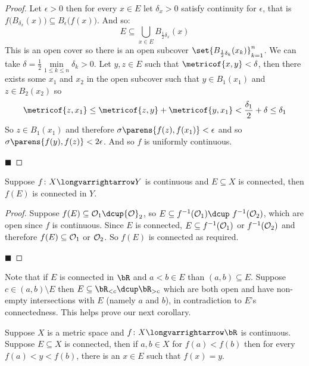 \documentclass[10pt]{article}
\def\openset{{\cal O}}
\begin{document}
\begin{proof}

    Let $\epsilon>0$ then for every $x\in E$ let $\delta_x>0$ satisfy continuity for $\epsilon$, that is $f\bigl(B_{\delta_x}(x)\bigr)\subseteq B_\epsilon\bigl(f(x)\bigr)$.
    And so:
    \[ E \subseteq \bigcup_{x\in E}B_{\frac12\delta_x}(x) \]
    This is an open cover so there is an open subcover $\set{B_{\frac12\delta_k}(x_k)}_{k=1}^n$.
    We can take $\delta=\frac12\min\limits_{1\leq k\leq n}\delta_k>0$.
    Let $y,z\in E$ such that $\metricof{x,y}<\delta$, then there exists some $x_1$ and $x_2$ in the open subcover such that $y\in B_1(x_1)$ and $z\in B_2(x_2)$ so
    \[ \metricof{z,x_1}\leq\metricof{z,y}+\metricof{y,x_1}<\frac{\delta_1}2+\delta\leq\delta_1 \]
    So $z\in B_1(x_1)$ and therefore $\sigma\parens{f(z),f(x_1)}<\epsilon$ and so $\sigma\parens{f(y),f(z)}<2\epsilon$.
    And so $f$ is uniformly continuous.

    \hfill$\blacksquare$

\end{proof}

\begin{prop*}

    Suppose $f\colon X\longvarrightarrow Y$ is continuous and $E\subseteq X$ is connected, then $f(E)$ is connected in $Y$.

\end{prop*}

\begin{proof}

    Suppose $f(E)\subseteq\openset_1\dcup\openset_2$, so $E\subseteq f^{-1}(\openset_1)\dcup\ f^{-1}(\openset_2)$, which are open since $f$ is continuous.
    Since $E$ is connected, $E\subseteq f^{-1}(\openset_1)$ or $f^{-1}(\openset_2)$ and therefore $f(E)\subseteq\openset_1$ or $\openset_2$.
    So $f(E)$ is connected as required.

    \hfill$\blacksquare$

\end{proof}

Note that if $E$ is connected in $\bR$ and $a<b\in E$ than $(a,b)\subseteq E$.
Suppose $c\in(a,b)\setminus E$ then $E\subseteq\bR_{<c}\dcup\bR_{>c}$ which are both open and have non-empty intersections with $E$ (namely $a$ and $b$), in contradiction to $E$'s connectedness.
This helps prove our next corollary.

\begin{coro*}

    Suppose $X$ is a metric space and $f\colon X\longvarrightarrow\bR$ is continuous.
    Suppose $E\subseteq X$ is connected, then if $a,b\in X$ for $f(a)<f(b)$ then for every $f(a)<y<f(b)$, there is an $x\in E$ such that $f(x)=y$.

\end{coro*}
\end{document}
